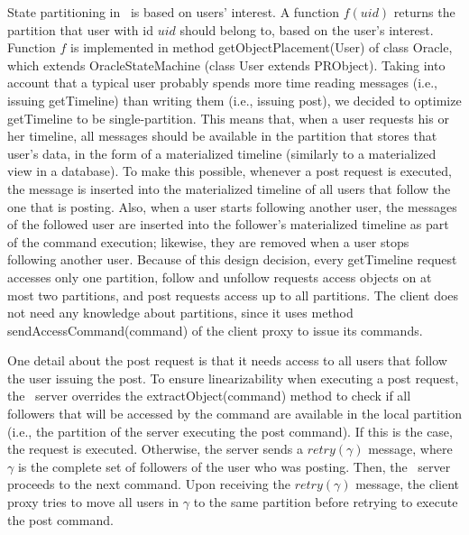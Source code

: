 State partitioning in \appname\ is based on users' interest. A function $f(uid)$ returns the partition that user with id $uid$ should belong to, based on the user's interest. Function $f$ is implemented in method getObjectPlacement(User) of class \appname{}Oracle, which extends OracleStateMachine (class User extends PRObject). Taking into account that a typical user probably spends more time reading messages (i.e., issuing getTimeline) than writing them (i.e., issuing post), we decided to optimize getTimeline to be single-partition. This means that, when a user requests his or her timeline, all messages should be available in the partition that stores that user's data, in the form of a materialized timeline (similarly to a materialized view in a database). To make this possible, whenever a post request is executed, the message is inserted into the materialized timeline of all users that follow the one that is posting. Also, when a user starts following another user, the messages of the followed user are inserted into the follower's materialized timeline as part of the command execution; likewise, they are removed when a user stops following another user. Because of this design decision, every getTimeline request accesses only one partition, follow and unfollow requests access objects on at most two partitions, and post requests access up to all partitions. The \appname{} client does not need any knowledge about partitions, since it uses method sendAccessCommand(command) of the \dssmr{} client proxy to issue its commands.

One detail about the post request is that it needs access to all users that follow the user issuing the post.
To ensure linearizability when executing a post request, the \appname\ server overrides the extractObject(command) method to check if all followers that will be accessed by the command are available in the local partition (i.e., the partition of the server executing the post command).
If this is the case, the request is executed.
Otherwise, the server sends a $retry(\gamma)$ message, where $\gamma$ is the complete set of followers of the user who was posting.
Then, the \appname\ server proceeds to the next command.
Upon receiving the $retry(\gamma)$ message, the client proxy tries to move all users in $\gamma$ to the same partition before retrying to execute the post command.
